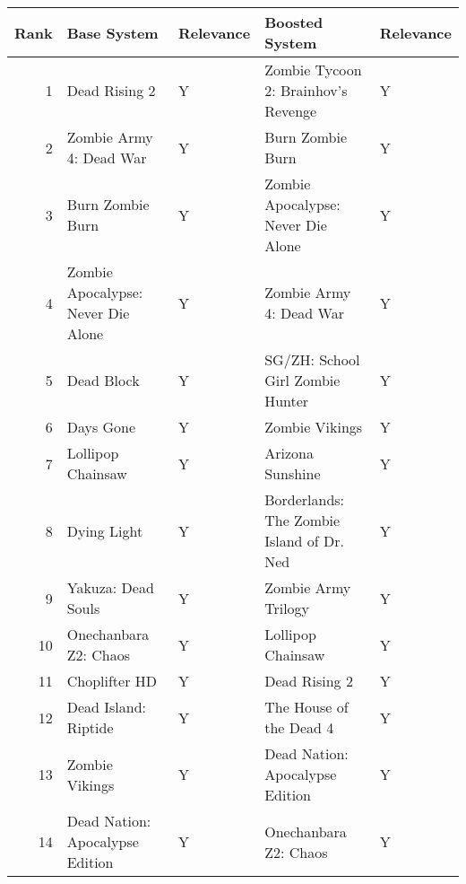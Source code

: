 \begin{tabular}{rllll}
\toprule
 Rank &                                      Base System & Relevance &                             Boosted System & Relevance \\
\midrule
    1 &                                    Dead Rising 2 &         Y &        Zombie Tycoon 2: Brainhov's Revenge &         Y \\
    2 &                          Zombie Army 4: Dead War &         Y &                           Burn Zombie Burn &         Y \\
    3 &                                 Burn Zombie Burn &         Y &         Zombie Apocalypse: Never Die Alone &         Y \\
    4 &               Zombie Apocalypse: Never Die Alone &         Y &                    Zombie Army 4: Dead War &         Y \\
    5 &                                       Dead Block &         Y &           SG/ZH: School Girl Zombie Hunter &         Y \\
    6 &                                        Days Gone &         Y &                             Zombie Vikings &         Y \\
    7 &                                Lollipop Chainsaw &         Y &                           Arizona Sunshine &         Y \\
    8 &                                      Dying Light &         Y &  Borderlands: The Zombie Island of Dr. Ned &         Y \\
    9 &                               Yakuza: Dead Souls &         Y &                        Zombie Army Trilogy &         Y \\
   10 &                            Onechanbara Z2: Chaos &         Y &                          Lollipop Chainsaw &         Y \\
   11 &                                    Choplifter HD &         Y &                              Dead Rising 2 &         Y \\
   12 &                             Dead Island: Riptide &         Y &                    The House of the Dead 4 &         Y \\
   13 &                                   Zombie Vikings &         Y &            Dead Nation: Apocalypse Edition &         Y \\
   14 &                  Dead Nation: Apocalypse Edition &         Y &                      Onechanbara Z2: Chaos &         Y \\

\end{tabular}

